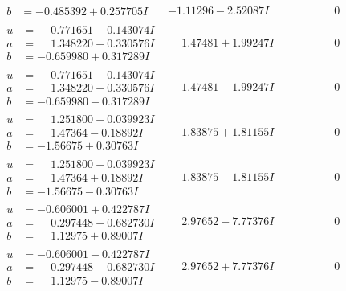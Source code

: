 \documentclass[1p]{elsarticle_modified}
\theoremstyle{definition}
\begin{document}
$$\begin{array}{c|c|c}
\begin{aligned}
b &= -0.485392 + 0.257705 I\end{aligned}
 & -1.11296 - 2.52087 I & \phantom{-0.000000 } 0 \\ \hline\begin{aligned}
u &= \phantom{-}0.771651 + 0.143074 I \\
a &= \phantom{-}1.348220 - 0.330576 I \\
b &= -0.659980 + 0.317289 I\end{aligned}
 & \phantom{-}1.47481 + 1.99247 I & \phantom{-0.000000 } 0 \\ \hline\begin{aligned}
u &= \phantom{-}0.771651 - 0.143074 I \\
a &= \phantom{-}1.348220 + 0.330576 I \\
b &= -0.659980 - 0.317289 I\end{aligned}
 & \phantom{-}1.47481 - 1.99247 I & \phantom{-0.000000 } 0 \\ \hline\begin{aligned}
u &= \phantom{-}1.251800 + 0.039923 I \\
a &= \phantom{-}1.47364 - 0.18892 I \\
b &= -1.56675 + 0.30763 I\end{aligned}
 & \phantom{-}1.83875 + 1.81155 I & \phantom{-0.000000 } 0 \\ \hline\begin{aligned}
u &= \phantom{-}1.251800 - 0.039923 I \\
a &= \phantom{-}1.47364 + 0.18892 I \\
b &= -1.56675 - 0.30763 I\end{aligned}
 & \phantom{-}1.83875 - 1.81155 I & \phantom{-0.000000 } 0 \\ \hline\begin{aligned}
u &= -0.606001 + 0.422787 I \\
a &= \phantom{-}0.297448 - 0.682730 I \\
b &= \phantom{-}1.12975 + 0.89007 I\end{aligned}
 & \phantom{-}2.97652 - 7.77376 I & \phantom{-0.000000 } 0 \\ \hline\begin{aligned}
u &= -0.606001 - 0.422787 I \\
a &= \phantom{-}0.297448 + 0.682730 I \\
b &= \phantom{-}1.12975 - 0.89007 I\end{aligned}
 & \phantom{-}2.97652 + 7.77376 I & \phantom{-0.000000 } 0\\

\end{array}$$
\end{document}
